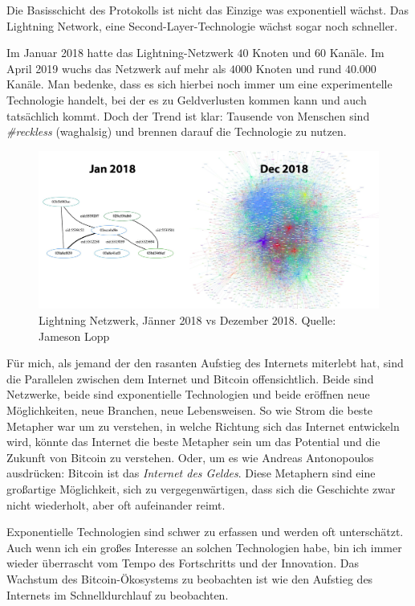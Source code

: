 Die Basisschicht des Protokolls ist nicht das Einzige was exponentiell wächst.
Das Lightning Network, eine Second-Layer-Technologie wächst sogar noch
schneller.

Im Januar 2018 hatte das Lightning-Netzwerk $40$ Knoten und $60$ Kanäle. Im
April 2019 wuchs das Netzwerk auf mehr als $4000$ Knoten und rund $40.000$
Kanäle. Man bedenke, dass es sich hierbei noch immer um eine experimentelle
Technologie handelt, bei der es zu Geldverlusten kommen kann und auch
tatsächlich kommt. Doch der Trend ist klar: Tausende von Menschen sind
\textit{\#reckless} (waghalsig) und brennen darauf die Technologie zu nutzen.

\begin{figure}
  \includegraphics{assets/images/lnd-growth-lopp-white.png}
  \caption{Lightning Netzwerk, Jänner 2018 vs Dezember 2018. Quelle: Jameson Lopp}
  \label{fig:lnd-growth-lopp-white.png}
\end{figure}

Für mich, als jemand der den rasanten Aufstieg des Internets miterlebt hat, sind
die Parallelen zwischen dem Internet und Bitcoin offensichtlich. Beide sind
Netzwerke, beide sind exponentielle Technologien und beide eröffnen neue
Möglichkeiten, neue Branchen, neue Lebensweisen. So wie Strom die beste Metapher
war um zu verstehen, in welche Richtung sich das Internet entwickeln wird,
könnte das Internet die beste Metapher sein um das Potential und die Zukunft von
Bitcoin zu verstehen. Oder, um es wie Andreas Antonopoulos ausdrücken: Bitcoin
ist das \textit{Internet des Geldes}. Diese Metaphern sind eine großartige
Möglichkeit, sich zu vergegenwärtigen, dass sich die Geschichte zwar nicht
wiederholt, aber oft aufeinander reimt.

Exponentielle Technologien sind schwer zu erfassen und werden oft unterschätzt.
Auch wenn ich ein großes Interesse an solchen Technologien habe, bin ich immer
wieder überrascht vom Tempo des Fortschritts und der Innovation. Das Wachstum
des Bitcoin-Ökosystems zu beobachten ist wie den Aufstieg des Internets im
Schnelldurchlauf zu beobachten.

